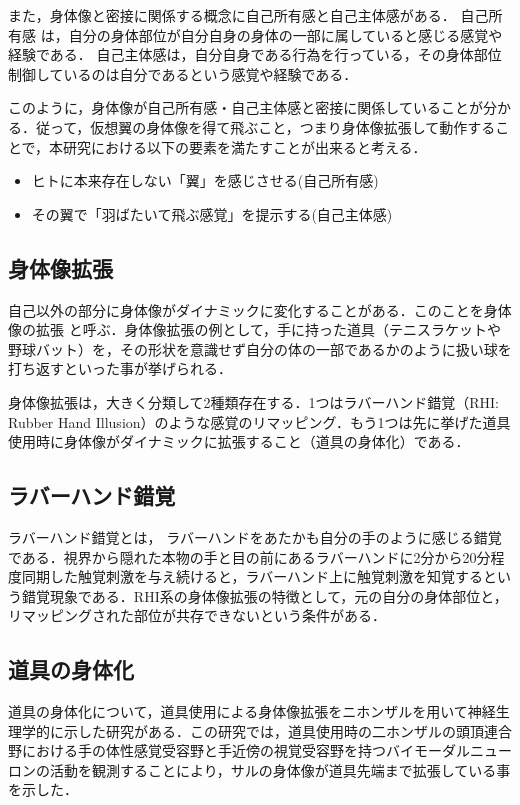 \begin{small}
    また，身体像と密接に関係する概念に自己所有感と自己主体感がある．
    自己所有感 は，自分の身体部位が自分自身の身体の一部に属していると感じる感覚や経験である．
    自己主体感は，自分自身である行為を行っている，その身体部位制御しているのは自分であるという感覚や経験である．

    このように，身体像が自己所有感・自己主体感と密接に関係していることが分かる．従って，仮想翼の身体像を得て飛ぶこと，つまり身体像拡張して動作することで，本研究における以下の要素を満たすことが出来ると考える．

    \begin{itemize}
        \item ヒトに本来存在しない「翼」を感じさせる(自己所有感)
        \item その翼で「羽ばたいて飛ぶ感覚」を提示する(自己主体感)
    \end{itemize}

  \subsection{身体像拡張}

    自己以外の部分に身体像がダイナミックに変化することがある．このことを身体像の拡張
    と呼ぶ．身体像拡張の例として，手に持った道具（テニスラケットや野球バット）を，その形状を意識せず自分の体の一部であるかのように扱い球を打ち返すといった事が挙げられる．

    身体像拡張は，大きく分類して2種類存在する．1つはラバーハンド錯覚（RHI: Rubber Hand Illusion）\cite{botvinick1998rubber}のような感覚のリマッピング．もう1つは先に挙げた道具使用時に身体像がダイナミックに拡張すること（道具の身体化）である．

    \subsection{ラバーハンド錯覚} %
      ラバーハンド錯覚とは， ラバーハンドをあたかも自分の手のように感じる錯覚である．視界から隠れた本物の手と目の前にあるラバーハンドに2分から20分程度同期した触覚刺激を与え続けると，ラバーハンド上に触覚刺激を知覚するという錯覚現象である．RHI系の身体像拡張の特徴として，元の自分の身体部位と，リマッピングされた部位が共存できないという条件がある．

    \subsection{道具の身体化} %
      道具の身体化について，道具使用による身体像拡張をニホンザルを用いて神経生理学的に示した研究がある\cite{iriki1996coding}．この研究では，道具使用時の二ホンザルの頭頂連合野における手の体性感覚受容野と手近傍の視覚受容野を持つバイモーダルニューロンの活動を観測することにより，サルの身体像が道具先端まで拡張している事を示した．


\end{small}
